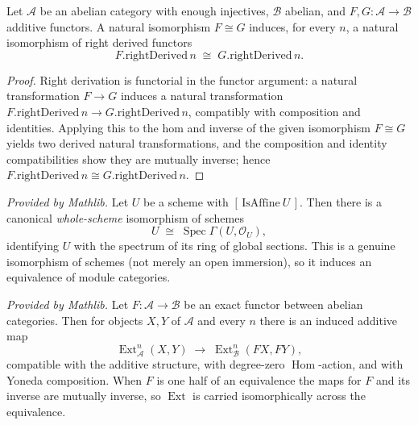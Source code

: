 \begin{lemma}\leanok
  \label{lem:rightDerivedNatIso}
  Let \(\mathcal{A}\) be an abelian category with enough injectives, \(\mathcal{B}\) abelian, and
  \(F, G : \mathcal{A} \to \mathcal{B}\) additive functors. A natural isomorphism \(F \cong G\)
  induces, for every \(n\), a natural isomorphism of right derived functors
  \[
    F.\mathrm{rightDerived}\,n \;\cong\; G.\mathrm{rightDerived}\,n.
  \]
\end{lemma}
\begin{proof}

\leanok
  Right derivation is functorial in the functor argument: a natural transformation \(F \to G\)
  induces a natural transformation \(F.\mathrm{rightDerived}\,n \to G.\mathrm{rightDerived}\,n\),
  compatibly with composition and identities. Applying this to the hom and inverse of the given
  isomorphism \(F \cong G\) yields two derived natural transformations, and the composition and
  identity compatibilities show they are mutually inverse; hence
  \(F.\mathrm{rightDerived}\,n \cong G.\mathrm{rightDerived}\,n\).
\end{proof}

\begin{lemma}
  \label{lem:isoSpec_scheme_mathlib}
  \mathlibok
  \textit{Provided by Mathlib.}
  Let \(U\) be a scheme with \([\,\mathrm{IsAffine}\ U\,]\). Then there is a canonical
  \emph{whole-scheme} isomorphism of schemes
  \[
    U \;\cong\; \operatorname{Spec}\Gamma(U, \mathcal{O}_U),
  \]
  identifying \(U\) with the spectrum of its ring of global sections. This is a genuine isomorphism of
  schemes (not merely an open immersion), so it induces an equivalence of module categories.
\end{lemma}

\begin{lemma}
  \label{lem:ext_mapExactFunctor_mathlib}
  \mathlibok
  \textit{Provided by Mathlib.}
  Let \(F : \mathcal{A} \to \mathcal{B}\) be an exact functor between abelian categories. Then for
  objects \(X, Y\) of \(\mathcal{A}\) and every \(n\) there is an induced additive map
  \[
    \operatorname{Ext}^n_{\mathcal{A}}(X, Y) \;\longrightarrow\;
      \operatorname{Ext}^n_{\mathcal{B}}(F X, F Y),
  \]
  compatible with the additive structure, with degree-zero \(\operatorname{Hom}\)-action, and with
  Yoneda composition. When \(F\) is one half of an equivalence the maps for \(F\) and its inverse are
  mutually inverse, so \(\operatorname{Ext}\) is carried isomorphically across the equivalence.
\end{lemma}

